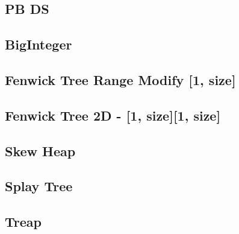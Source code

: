 \documentclass[11pt,twocolumn,a4paper]{article}
\begin{document}
\subsection{PB DS}


\subsection{BigInteger}


\subsection{Fenwick Tree Range Modify [1, size]}


\subsection{Fenwick Tree 2D - [1, size][1, size]}


\subsection{Skew Heap}


\subsection{Splay Tree}


\subsection{Treap}

\end{document}
